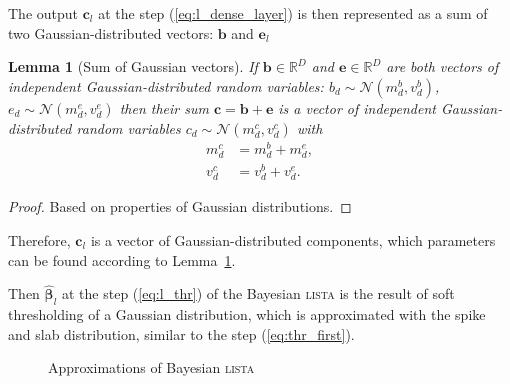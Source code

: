 \documentclass[letterpaper]{article}
\newtheorem{lemma}{Lemma}
\begin{document}
The output $\mathbf{c}_l$ at the step (\ref{eq:l_dense_layer}) is then represented as a sum of two Gaussian-distributed vectors: $\mathbf{b}$ and $\mathbf{e}_l$


\begin{lemma}[Sum of Gaussian vectors]
\label{thm:sum_vectors}
If $\mathbf{b} \in \mathbb{R}^{D}$ and $\mathbf{e} \in \mathbb{R}^{D}$ are both vectors of independent Gaussian-distributed random variables: $b_{d} \sim \mathcal{N}(m^b_{d}, v^b_{d})$, $e_{d} \sim \mathcal{N}(m^e_{d}, v^e_{d})$ then their sum $\mathbf{c} = \mathbf{b} + \mathbf{e}$ is a vector of independent Gaussian-distributed random variables $c_{d} \sim \mathcal{N}(m^c_{d}, v^c_{d})$ with
\begin{subequations}
\begin{align}
m^c_{d} &= m^b_{d} + m^e_{d}, \\
v^c_{d} &= v^b_{d} + v^e_{d}.
 \end{align}
\end{subequations}
\end{lemma}
\begin{proof}
Based on properties of Gaussian distributions.
\end{proof}

Therefore, $\mathbf{c}_l$ is a vector of Gaussian-distributed components, which parameters can be found according to Lemma~\ref{thm:sum_vectors}.

Then $\widehat{\boldsymbol\beta}_{l}$ at the step (\ref{eq:l_thr}) of the Bayesian \textsc{lista} is the result of soft thresholding of a Gaussian distribution, which is approximated with the spike and slab distribution,  similar to the step (\ref{eq:thr_first}).

\begin{figure}[!t]
\caption{Approximations of Bayesian \textsc{lista}}
\end{figure}
\end{document}
